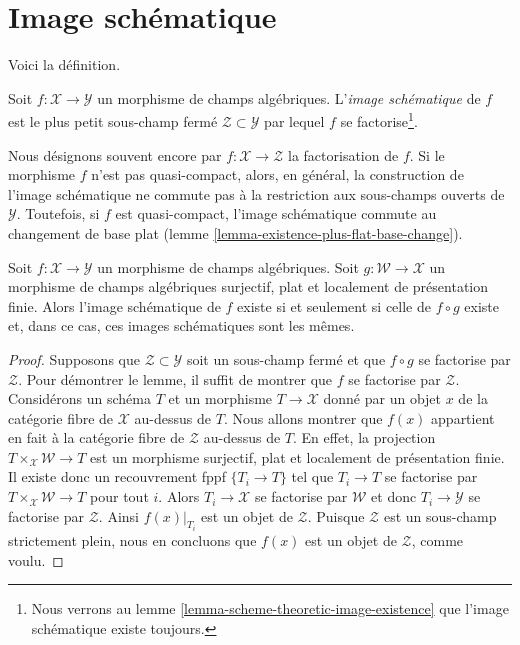 \section{Image schématique}
\label{section-scheme-theoretic-image}

\noindent
Voici la définition.

\begin{definition}
\label{definition-scheme-theoretic-image}
Soit $f : \mathcal{X} \to \mathcal{Y}$ un morphisme de champs algébriques.
L'{\it image schématique} de $f$ est le plus petit sous-champ fermé
$\mathcal{Z} \subset \mathcal{Y}$ par lequel $f$
se factorise\footnote{Nous verrons au
lemme \ref{lemma-scheme-theoretic-image-existence}
que l'image schématique existe toujours.}.
\end{definition}

\noindent
Nous désignons souvent encore par $f : \mathcal{X} \to \mathcal{Z}$ la factorisation de $f$.
Si le morphisme $f$ n'est pas quasi-compact, alors, en général, la
construction de l'image schématique ne commute pas à la
restriction aux sous-champs ouverts de $\mathcal{Y}$. Toutefois, si $f$ est
quasi-compact, l'image schématique commute au changement de base plat
(lemme \ref{lemma-existence-plus-flat-base-change}).

\begin{lemma}
\label{lemma-cover-upstairs}
Soit $f : \mathcal{X} \to \mathcal{Y}$ un morphisme de champs algébriques.
Soit $g : \mathcal{W} \to \mathcal{X}$ un morphisme de champs algébriques
surjectif, plat et localement de présentation finie.
Alors l'image schématique de $f$ existe si et seulement si celle de
$f \circ g$ existe et, dans ce cas, ces images schématiques
sont les mêmes.
\end{lemma}

\begin{proof}
Supposons que $\mathcal{Z} \subset \mathcal{Y}$
soit un sous-champ fermé et que $f \circ g$ se factorise par $\mathcal{Z}$.
Pour démontrer le lemme, il suffit de montrer
que $f$ se factorise par $\mathcal{Z}$.
Considérons un schéma $T$ et un morphisme $T \to \mathcal{X}$
donné par un objet $x$ de la catégorie fibre de $\mathcal{X}$ au-dessus de $T$.
Nous allons montrer que $f(x)$ appartient en fait à la catégorie fibre de $\mathcal{Z}$
au-dessus de $T$. En effet, la projection $T \times_\mathcal{X} \mathcal{W} \to T$
est un morphisme surjectif, plat et localement de présentation finie.
Il existe donc un recouvrement fppf $\{T_i \to T\}$ tel que
$T_i \to T$ se factorise par $T \times_\mathcal{X} \mathcal{W} \to T$
pour tout $i$. Alors $T_i \to \mathcal{X}$ se factorise par $\mathcal{W}$
et donc $T_i \to \mathcal{Y}$ se factorise par $\mathcal{Z}$.
Ainsi $f(x)|_{T_i}$ est un objet de $\mathcal{Z}$.
Puisque $\mathcal{Z}$ est un sous-champ strictement plein, nous en concluons
que $f(x)$ est un objet de $\mathcal{Z}$, comme voulu.
\end{proof}

